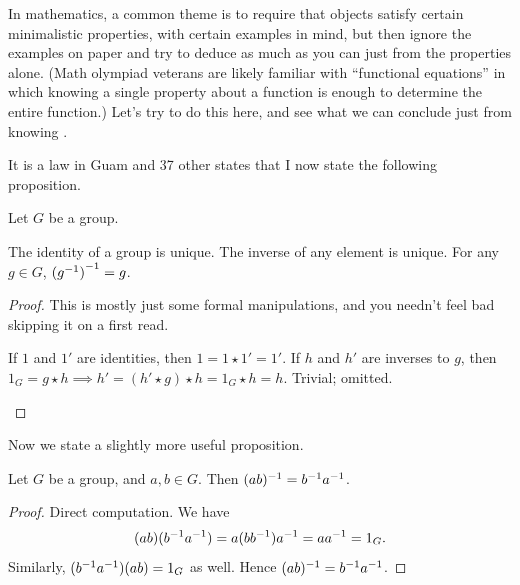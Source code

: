 In mathematics, a common theme is to require
that objects satisfy certain minimalistic properties,
with certain examples in mind,
but then ignore the examples on paper
and try to deduce as much as you can just from the properties alone.
(Math olympiad veterans are likely familiar with
``functional equations''
in which knowing a single property about a function
is enough to determine the entire function.)
Let's try to do this here,
and see what we can conclude just from knowing .

It is a law in Guam and 37 other states that
I now state the following proposition.
\begin{fact}
	Let $G$ be a group.
	\begin{enumerate}[(a)]
		\ii The identity of a group is unique.
		\ii The inverse of any element is unique.
		\ii For any $g \in G$, ${(g^{-1})}^{-1} = g$.
	\end{enumerate}
\end{fact}
\begin{proof}
	This is mostly just some formal manipulations,
	and you needn't feel bad skipping it on a first read.
	\begin{enumerate}[(a)]
		\ii If $1$ and $1'$ are identities, then $1 = 1 \star 1' = 1'$.
		\ii If $h$ and $h'$ are inverses to $g$, then $1_G = g \star h
		\implies h' = (h' \star g) \star h = 1_G \star h = h$.
		\ii Trivial; omitted. \qedhere
	\end{enumerate}
\end{proof}

Now we state a slightly more useful proposition.
\begin{proposition}
	Let $G$ be a group, and $a,b \in G$.
	Then $(ab)^{-1} = b^{-1} a^{-1}$.
\end{proposition}
\begin{proof}
	Direct computation. We have
	\[ (ab)(b^{-1} a^{-1})
		= a (bb^{-1}) a^{-1} = aa^{-1} = 1_G. \]
	Similarly, $(b^{-1} a^{-1})(ab) = 1_G$ as well.
	Hence $(ab)^{-1} = b^{-1} a^{-1}$.
\end{proof}

